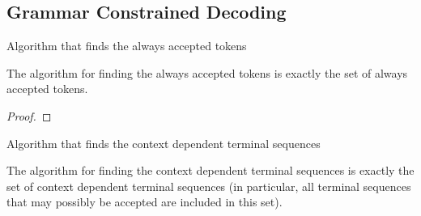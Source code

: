 
\subsection{Grammar Constrained Decoding}

\begin{definition}
    \label{def:FindAlwaysAccepted}
    \leanok
    Algorithm that finds the always accepted tokens
\end{definition}


\begin{lemma}
    \label{lem:FindAlwaysAcceptedCorrect}
    The algorithm for finding the always accepted tokens is exactly the set of always accepted tokens.
\end{lemma}
\begin{proof}
\end{proof}

\begin{definition}
    \label{def:FindContextDependentTerminalSequences}
    \leanok
    Algorithm that finds the context dependent terminal sequences 
\end{definition}

\begin{lemma}
    \label{lem:FindContextDependentCorrect}
    The algorithm for finding the context dependent terminal sequences is exactly the set of context dependent terminal sequences (in particular, all terminal sequences that may possibly be accepted are included in this set).
\end{lemma}

